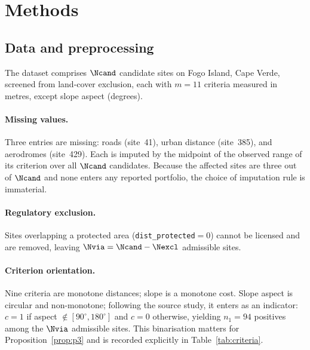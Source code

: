 
\section{Methods}
\label{sec:methods}

\subsection{Data and preprocessing}

The dataset comprises $\Ncand$ candidate sites on Fogo Island, Cape Verde,
screened from land-cover exclusion, each with $m=11$ criteria measured in
metres, except slope aspect (degrees).

\paragraph{Missing values.}
Three entries are missing: roads (site~41), urban distance (site~385), and
aerodromes (site~429).
Each is imputed by the midpoint of the observed range of its criterion over
all $\Ncand$ candidates.
Because the affected sites are three out of $\Ncand$ and none enters any
reported portfolio, the choice of imputation rule is immaterial.

\paragraph{Regulatory exclusion.}
Sites overlapping a protected area (\texttt{dist\_protected}$=0$) cannot
be licensed and are removed, leaving $\Nvia=\Ncand-\Nexcl$ admissible
sites.

\paragraph{Criterion orientation.}
Nine criteria are monotone distances; slope is a monotone cost.
Slope aspect is circular and non-monotone; following the source study, it
enters as an indicator: $c=1$ if aspect $\notin[90^\circ,180^\circ]$ and
$c=0$ otherwise, yielding $n_1=94$ positives among the $\Nvia$ admissible
sites.
This binarisation matters for Proposition~\ref{prop:p3}
and is recorded explicitly in Table~\ref{tab:criteria}.


